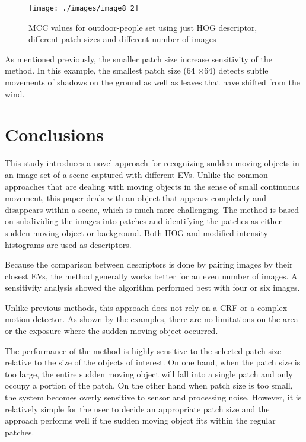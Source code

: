 \documentclass[preprint,12pt,3p]{elsarticle}
\begin{document}
\begin{figure}[H]
\centering
\texttt{[image: ./images/image8\_2]}
\caption{MCC values for outdoor-people set using just HOG descriptor, different patch sizes and different number of images}
\label{fig:image8_2}
\end{figure}

As mentioned previously, the smaller patch size increase sensitivity of the method. In this example, the smallest patch size (64 $\times$64) detects subtle movements of shadows on the ground as well as leaves that have shifted from the wind.



\section{Conclusions}
\label{sec5}
This study introduces a novel approach for recognizing sudden moving objects in an image set of a scene captured with different EVs. Unlike the common approaches that are dealing with moving objects in the sense of small continuous movement, this paper deals with an object that appears completely and disappears within a scene, which is much more challenging.  The method is based on subdividing the images into patches and identifying the patches as either sudden moving object or background. Both HOG and modified intensity histograms are used as descriptors. 

Because the comparison between descriptors is done by pairing images by their closest EVs, the method generally works better for an even number of images. A sensitivity analysis showed the algorithm performed best with four or six images. 

Unlike previous methods, this approach does not rely on a CRF or a complex motion detector. As shown by the examples, there are no limitations on the area or the exposure where the sudden moving object occurred.

The performance of the method is highly sensitive to the selected patch size relative to the size of the objects of interest. On one hand, when the patch size is too large, the entire sudden moving object will fall into a single patch and only occupy a portion of the patch. On the other hand when patch size is too small, the system becomes overly sensitive to sensor and processing noise. However, it is relatively simple for the user to decide an appropriate patch size and the approach performs well if the sudden moving object fits within the regular patches.
\end{document}
